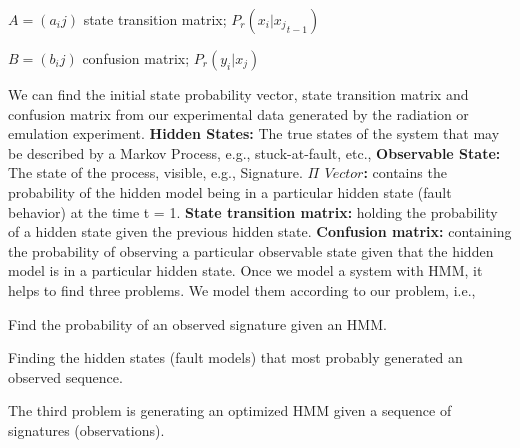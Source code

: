 $A = (a_ij)$ state transition matrix;  \hspace{0.3cm} $P_r(x_i | {x_j}_{t-1})$


$B = (b_ij)$  confusion matrix;     \hspace{0.3cm}        $P_r(y_i | x_j)$ 


We can find the initial state probability vector, state transition matrix and confusion matrix  from our experimental data generated by the radiation or emulation experiment.
\textbf{Hidden States:} The true states of the system that may be described by a Markov Process, e.g., stuck-at-fault, etc.,
\textbf{Observable State:} The state of the process, visible, e.g., Signature.
\textbf{$\Pi$ $Vector$:} contains the probability of the hidden model being in a particular hidden state (fault behavior) at the time t = 1.
\textbf{State transition matrix:}  holding the probability of a hidden state given the previous hidden state.
\textbf{Confusion matrix:} containing the probability of observing a particular observable state given that the hidden model is in a particular hidden state. 
Once we model a system with HMM, it helps to find three problems. We model them according to our problem, i.e.,
\begin{tcolorbox}[width=\textwidth,colback={gray},title={Evaluation },colbacktitle=gray,coltitle=black]  
Find the probability of an observed signature given an HMM.  
\end{tcolorbox}
\begin{tcolorbox}[width=\textwidth,colback={gray},title={Decoding },colbacktitle=gray,coltitle=black]  
Finding the hidden states (fault models) that most probably generated an observed sequence. 
\end{tcolorbox}
\begin{tcolorbox}[width=\textwidth,colback={gray},title={Learning },colbacktitle=gray,coltitle=black]  
The third problem is generating an optimized HMM given a sequence of signatures (observations).
\end{tcolorbox}
